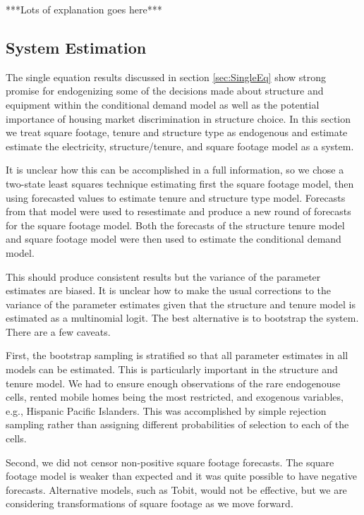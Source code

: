 \documentclass{article}
\begin{document}
***Lots of explanation goes here***




  \subsection{System Estimation}

The single equation results discussed in section \ref{sec:SingleEq} show strong promise for endogenizing some of the decisions made about structure and equipment within the conditional demand model as well as the potential importance of housing market discrimination in structure choice.  In this section we treat square footage, tenure and structure type as endogenous and estimate estimate the electricity, structure/tenure, and square footage model as a system.

It is unclear how this can be accomplished in a full information, so we chose a two-state least squares technique estimating first the square footage model, then using forecasted values to estimate tenure and structure type model.  Forecasts from that model were used to resestimate and produce a new round of forecasts for the square footage model.  Both the forecasts of the structure tenure model and square footage model were then used to estimate the conditional demand model.

This should produce consistent results but the variance of the parameter estimates are biased.  It is unclear how to make the usual corrections to the variance of the parameter estimates given that the structure and tenure model is estimated as a multinomial logit.  The best alternative is to bootstrap the system.  There are a few caveats.

First, the bootstrap sampling is stratified so that all parameter estimates in all models can be estimated.  This is particularly important in the structure and tenure model.  We had to ensure enough observations of the rare endogenouse cells, rented mobile homes being the most restricted, and exogenous variables, e.g., Hispanic Pacific Islanders.  This was accomplished by simple rejection sampling rather than assigning different probabilities of selection to each of the cells.

Second, we did not censor non-positive square footage forecasts.  The square footage model is weaker than expected and it was quite possible to have negative forecasts.  Alternative models, such as Tobit, would not be effective, but we are considering transformations of square footage as we move forward.  
\end{document}
